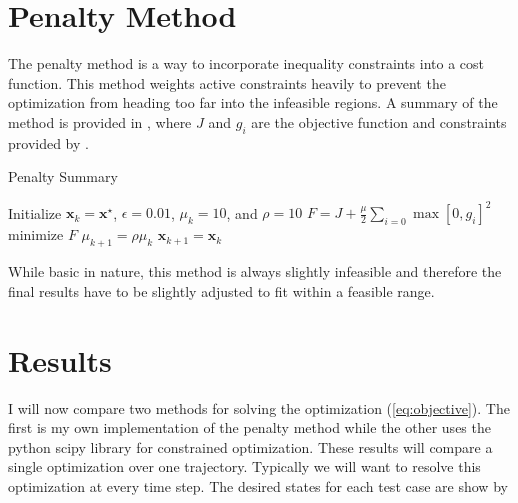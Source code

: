 \documentclass{article}
\newcommand{\norm}[1]{\left\Vert{#1}\right\Vert}
\begin{document}
\section*{Penalty Method}

The penalty method is a way to incorporate inequality constraints into a cost function. This method weights active constraints heavily to prevent the optimization from heading too far into the infeasible regions. A summary of the method is provided in , where $J$ and $g_i$ are the objective function and constraints provided by . 

\begin{algorithm}
	\caption{Penalty Summary}\label{alg:penalty_summary}
	\begin{algorithmic}[1]
		\item Initialize $\mathbf{x}_k = \mathbf{x}^\star$, $\epsilon=0.01$, $\mu_k=10$, and $\rho=10$
		\While{$\norm{\sum \mathbf{u} - \sum \mathbf{u}_d} > \epsilon$}
		\State $F = J + \frac{\mu}{2}\sum_{i=0}\max[0,g_i]^2$
		\State minimize $F$
		\State $\mu_{k+1} = \rho\mu_k$
		\State $\mathbf{x}_{k+1} = \mathbf{x}_k$
		\EndWhile
	\end{algorithmic}
\end{algorithm}


While basic in nature, this method is always slightly infeasible and therefore the final results have to be slightly adjusted to fit within a feasible range.


\section*{Results}

I will now compare two methods for solving the optimization (\cref{eq:objective}). The first is my own implementation of the penalty method while the other uses the python scipy library for constrained optimization. These results will compare a single optimization over one trajectory. Typically we will want to resolve this optimization at every time step. The desired states for each test case are show by
\end{document}
